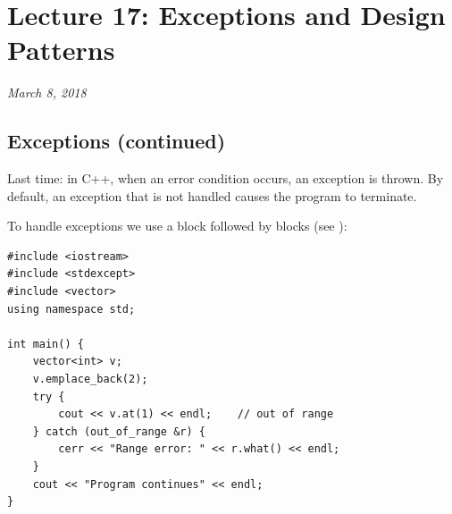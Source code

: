 \chapter{Lecture 17: Exceptions and Design Patterns}

\begin{center}
\textit{March 8, 2018}
\end{center}

\section{Exceptions (continued)}
Last time: in C++, when an error condition occurs, an exception is thrown. By
default, an exception that is not handled causes the program to terminate.

To handle exceptions we use a  block followed by
 blocks (see ):
\begin{lstlisting}[style=cpp]
#include <iostream>
#include <stdexcept>
#include <vector>
using namespace std;

int main() {
    vector<int> v;
    v.emplace_back(2);
    try {
        cout << v.at(1) << endl;    // out of range
    } catch (out_of_range &r) {
        cerr << "Range error: " << r.what() << endl;
    }
    cout << "Program continues" << endl;
}
\end{lstlisting}

